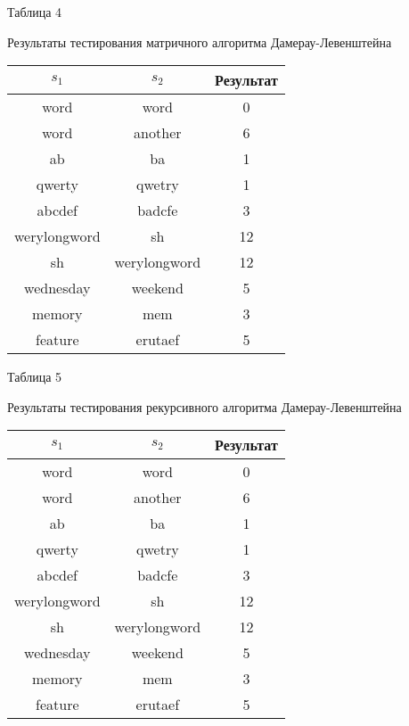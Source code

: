\hfill

\begin{flushright}
    Таблица 4
\end{flushright}

\begin{center}
    Результаты тестирования матричного алгоритма Дамерау-Левенштейна

    \begin{tabular}{|c|c|c|}
        \hline
        $s_1$ & $s_2$ & Результат \\
        \hline
        word & word & 0 \\
        \hline
        word & another & 6 \\
        \hline
        ab & ba & 1 \\
        \hline
        qwerty & qwetry & 1 \\
        \hline
        abcdef & badcfe & 3 \\
        \hline
        werylongword & sh & 12 \\
        \hline
        sh & werylongword & 12 \\
        \hline
        wednesday & weekend & 5 \\
        \hline
        memory & mem & 3 \\
        \hline
        feature & erutaef & 5 \\
        \hline
    \end{tabular}
\end{center}

\hfill

\begin{flushright}
    Таблица 5
\end{flushright}

\begin{center}
    Результаты тестирования рекурсивного алгоритма Дамерау-Левенштейна

    \begin{tabular}{|c|c|c|}
        \hline
        $s_1$ & $s_2$ & Результат \\
        \hline
        word & word & 0 \\
        \hline
        word & another & 6 \\
        \hline
        ab & ba & 1 \\
        \hline
        qwerty & qwetry & 1 \\
        \hline
        abcdef & badcfe & 3 \\
        \hline
        werylongword & sh & 12 \\
        \hline
        sh & werylongword & 12 \\
        \hline
        wednesday & weekend & 5 \\
        \hline
        memory & mem & 3 \\
        \hline
        feature & erutaef & 5 \\
        \hline
    \end{tabular}
\end{center}

